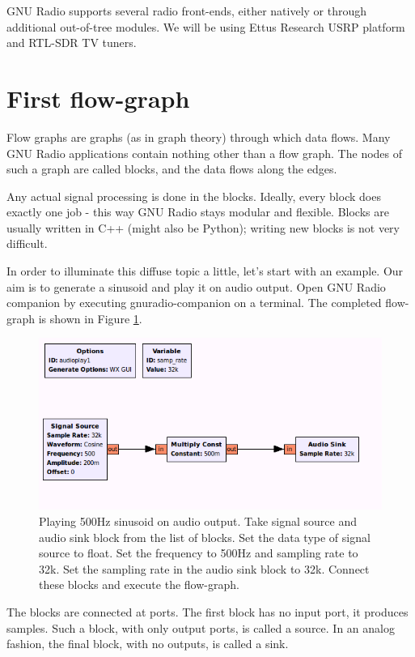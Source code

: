 \documentclass[a4paper,10pt]{report}
\begin{document}
GNU Radio supports several radio front-ends, either natively or through additional out-of-tree modules.
We will be using Ettus Research USRP platform and RTL-SDR TV tuners.

\section{First flow-graph}
Flow graphs are graphs (as in graph theory) through which data flows.
Many GNU Radio applications contain nothing other than a flow graph.
The nodes of such a graph are called blocks, and the data flows along the edges.

Any actual signal processing is done in the blocks.
Ideally, every block does exactly one job - this way GNU Radio stays modular and flexible.
Blocks are usually written in C++ (might also be Python); writing new blocks is not very difficult.

In order to illuminate this diffuse topic a little, let's start with an example.
Our aim is to generate a sinusoid and play it on audio output.
Open GNU Radio companion by executing gnuradio-companion on a terminal. 
The completed flow-graph is shown in Figure \ref{fig:audio-play1}.
\begin{figure}
\centering
 \includegraphics[scale=0.40]{figures/audio-play1.png}
 \caption{Playing 500Hz sinusoid on audio output.
 Take signal source and audio sink block from the list of blocks.
 Set the data type of signal source to float.
 Set the frequency to 500Hz and sampling rate to 32k.
 Set the sampling rate in the audio sink block to 32k.
 Connect these blocks and execute the flow-graph.\label{fig:audio-play1}}
\end{figure}

The blocks are connected at ports. 
The first block has no input port, it produces samples. 
Such a block, with only output ports, is called a source. 
In an analog fashion, the final block, with no outputs, is called a sink.
\end{document}
